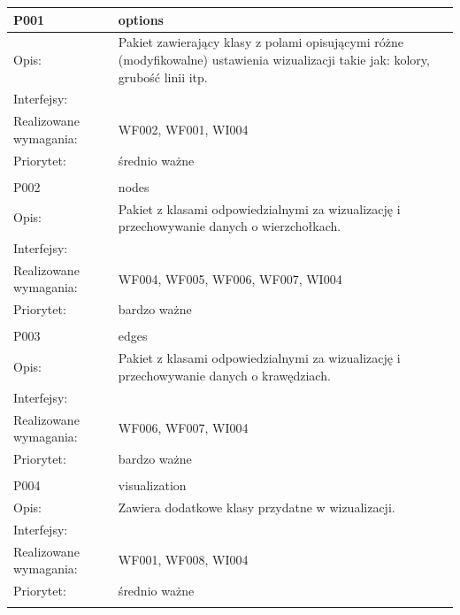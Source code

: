 \documentclass[a4paper,10pt]{article}
\begin{document}
\begin{center}
\begin{longtable}{|m{3cm}|m{9cm}|} \hline

P001 & options\\ \hline
Opis: & Pakiet zawierający klasy z polami opisującymi różne (modyfikowalne) ustawienia wizualizacji takie jak: kolory, grubość linii itp.     \\ \hline
Interfejsy: &     \\ \hline
Realizowane wymagania: & WF002, WF001, WI004 \\ \hline
Priorytet: & średnio ważne \\ \hline

\multicolumn{2}{c}{} \\
 \hline

P002 & nodes\\ \hline
Opis: & Pakiet z klasami odpowiedzialnymi za wizualizację i przechowywanie danych o wierzchołkach.    \\ \hline
Interfejsy: &     \\ \hline
Realizowane wymagania: & WF004, WF005, WF006, WF007, WI004 \\ \hline
Priorytet: & bardzo ważne \\ \hline

\multicolumn{2}{c}{} \\
 \hline

P003 & edges\\ \hline
Opis: & Pakiet z klasami odpowiedzialnymi za wizualizację i przechowywanie danych o krawędziach.    \\ \hline
Interfejsy: &     \\ \hline
Realizowane wymagania: & WF006, WF007, WI004 \\ \hline
Priorytet: & bardzo ważne \\ \hline

\multicolumn{2}{c}{} \\
 \hline

P004 & visualization\\ \hline
Opis: & Zawiera dodatkowe klasy przydatne w wizualizacji.\\ \hline
Interfejsy: &     \\ \hline
Realizowane wymagania: & WF001, WF008, WI004 \\ \hline
Priorytet: & średnio ważne \\ \hline

\multicolumn{2}{c}{} \\
 \hline


\end{longtable}
\end{center}
\end{document}
